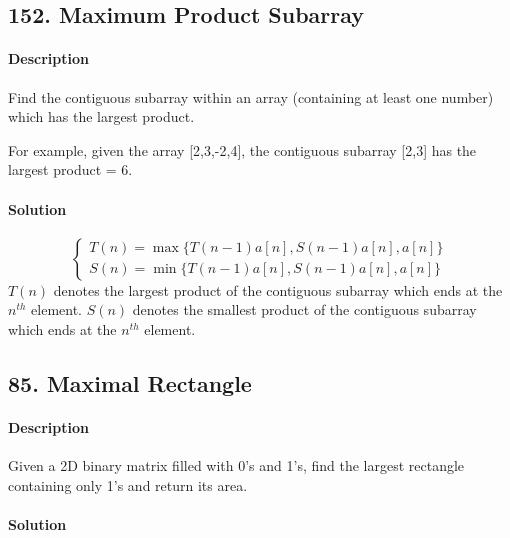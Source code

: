 \subsection{152. Maximum Product Subarray}

\paragraph{Description}

Find the contiguous subarray within an array (containing at least one number) which has the largest product.

For example, given the array [2,3,-2,4],
the contiguous subarray [2,3] has the largest product = 6.

\paragraph{Solution}
\begin{equation*}
\begin{cases}
T(n)=\max\{T(n-1)a[n],S(n-1)a[n],a[n]\}\\
S(n)=\min\{T(n-1)a[n],S(n-1)a[n],a[n]\}
\end{cases}
\end{equation*}
$T(n)$ denotes the largest product of the contiguous subarray which ends at the $n^{th}$ element. $S(n)$ denotes the smallest product of the contiguous subarray which ends at the $n^{th}$ element.

\subsection{85. Maximal Rectangle}

\paragraph{Description}

Given a 2D binary matrix filled with 0's and 1's, find the largest rectangle containing only 1's and return its area.

\paragraph{Solution}

